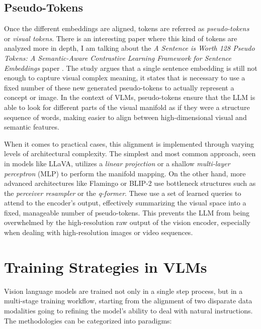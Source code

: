 \subsection{Pseudo-Tokens}
Once the different embeddings are aligned, tokens are referred as \textit{pseudo-tokens} or \textit{visual tokens}. There is an interesting paper where this kind of tokens are analyzed more in depth, I am talking about the \textit{A Sentence is Worth 128 Pseudo Tokens: A Semantic-Aware Contrastive Learning Framework for Sentence Embeddings
} paper \cite{tan2022sentenceworth128pseudo}. The study argues that a single sentence embedding is still not enough to capture visual complex meaning, it states that is necessary to use a fixed number of these new generated pseudo-tokens to actually represent a concept or image. In the context of VLMs, pseudo-tokens ensure that the LLM is able to look for different parts of the visual manifold as if they were a structure sequence of words, making easier to align between high-dimensional visual and semantic features. 

When it comes to practical cases, this alignment is implemented through varying levels of architectural complexity. The simplest and most common approach, seen in models like LLaVA, utilizes a \textit{linear projection} or a shallow \textit{multi-layer perceptron} (MLP) to perform the manifold mapping. On the other hand, more advanced architectures like Flamingo or BLIP-2 use bottleneck structures such as the \textit{perceiver resampler} or the \textit{q-former}. These use a set of learned queries to attend to the encoder's output, effectively summarizing the visual space into a fixed, manageable number of pseudo-tokens. This prevents the LLM from being overwhelmed by the high-resolution raw output of the vision encoder, especially when dealing with high-resolution images or video sequences.


\section{Training Strategies in VLMs}
Vision language models are trained not only in a single step process, but in a multi-stage training workflow, starting from the alignment of two disparate data modalities going to refining the model's ability to deal with natural instructions. The methodologies can be categorized into paradigms:

